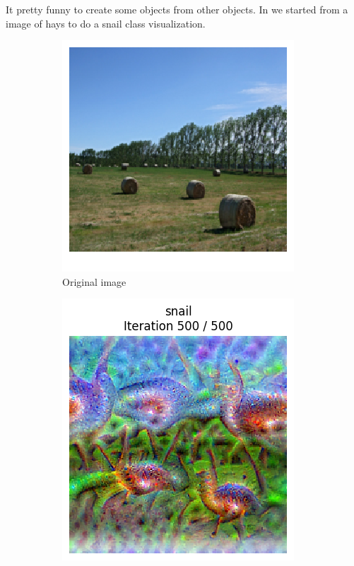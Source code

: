 It pretty funny to create some objects from other objects. In  we started from a image of hays to do a snail class visualization.

\begin{figure}[H]
    \centering
    \begin{subfigure}{.33\textwidth}
        \centering
        \includegraphics[width=\linewidth]{figs_propre2/hays.png}
        \caption{Original image}
        \label{fig:class_viz_start_image_dif:baseimage}
    \end{subfigure}%
    \begin{subfigure}{.33\textwidth}
        \centering
        \includegraphics[width=\linewidth]{SqueezeNet/snail_animated_init_img_reg++_last_frame.png}

\end{subfigure}
\end{figure}
